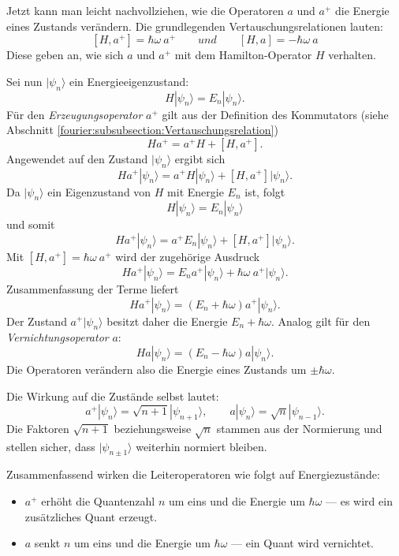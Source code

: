 Jetzt kann man leicht nachvollziehen, wie die Operatoren $a$ und $a^+$ die Energie eines Zustands verändern.
Die grundlegenden Vertauschungsrelationen lauten:
\[
	[H, a^+] = \hbar\omega~a^+
	\qquad
	und
	\qquad
	[H, a] = -\hbar\omega~a
\]
Diese geben an, wie sich $a$ und $a^+$ mit dem Hamilton-Operator $H$ verhalten.

Sei nun $|\psi_n\rangle$ ein Energieeigenzustand:
\[
	H|\psi_n\rangle = E_n|\psi_n\rangle.
\]
Für den \emph{Erzeugungsoperator} $a^+$ gilt aus der Definition des Kommutators (siehe Abschnitt \ref{fourier:subsubsection:Vertauschungsrelation})
%
\[
	H a^+ = a^+ H + [H, a^+].
\]
Angewendet auf den Zustand $|\psi_n\rangle$ ergibt sich
\[
	H a^+|\psi_n\rangle = a^+ H|\psi_n\rangle + [H, a^+]|\psi_n\rangle.
\]
Da $|\psi_n\rangle$ ein Eigenzustand von $H$ mit Energie $E_n$ ist, folgt
\[
	H|\psi_n\rangle = E_n|\psi_n\rangle
\]
und somit
\[
	H a^+|\psi_n\rangle = a^+ E_n|\psi_n\rangle + [H, a^+]|\psi_n\rangle.
\]
Mit $[H, a^+] = \hbar\omega~a^+$ wird der zugehörige Ausdruck
\[
	H a^+|\psi_n\rangle = E_n a^+|\psi_n\rangle + \hbar\omega~a^+|\psi_n\rangle.
\]
Zusammenfassung der Terme liefert
\begin{equation}
	H a^+|\psi_n\rangle = (E_n + \hbar\omega)a^+|\psi_n\rangle.
\end{equation}
Der Zustand $a^+|\psi_n\rangle$ besitzt daher die Energie $E_n + \hbar\omega$.
Analog gilt für den \emph{Vernichtungsoperator} $a$:
\begin{equation}
	H a |\psi_n\rangle = (E_n - \hbar\omega)a|\psi_n\rangle.
\end{equation}
Die Operatoren verändern also die Energie eines Zustands um $\pm\hbar\omega$.

Die Wirkung auf die Zustände selbst lautet:
\begin{equation}
	a^+|\psi_n\rangle = \sqrt{n+1}|\psi_{n+1}\rangle, \qquad a|\psi_n\rangle = \sqrt{n}|\psi_{n-1}\rangle.
\end{equation}
Die Faktoren $\sqrt{n+1}$ beziehungsweise $\sqrt{n}$ stammen aus der Normierung und stellen sicher, dass $|\psi_{n\pm 1}\rangle$ weiterhin normiert bleiben.

Zusammenfassend wirken die Leiteroperatoren wie folgt auf Energiezustände:
\begin{itemize}
	\item $a^+$ erhöht die Quantenzahl $n$ um eins und die Energie um $\hbar\omega$ ---
	es wird ein zusätzliches Quant erzeugt.
	\item $a$ senkt $n$ um eins und die Energie um $\hbar\omega$ ---
	ein Quant wird vernichtet.
\end{itemize}

